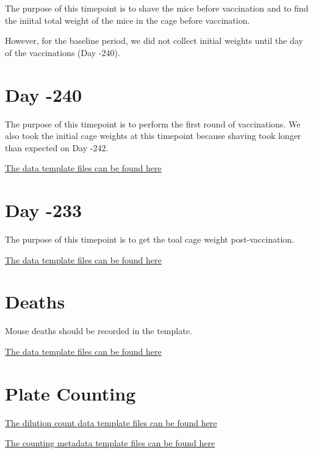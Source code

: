 \documentclass[]{book}
\begin{document}
The purpose of this timepoint is to shave the mice before vaccination
and to find the iniital total weight of the mice in the cage before
vaccination.

However, for the baseline period, we did not collect initial weights
until the day of the vaccinations (Day -240).

\chapter{Day -240}\label{day--240}

The purpose of this timepoint is to perform the first round of
vaccinations. We also took the initial cage weights at this timepoint
because shaving took longer than expected on Day -242.

\href{https://github.com/lyonsm7/impactb_book/raw/master/file_collection_templates/Base_Period/BP_T-240.xlsx}{The
data template files can be found here}

\chapter{Day -233}\label{day--233}

The purpose of this timepoint is to get the toal cage weight
post-vaccination.

\href{https://github.com/lyonsm7/impactb_book/raw/master/file_collection_templates/Base_Period/BP_T-233.xlsx}{The
data template files can be found here}

\chapter{Deaths}\label{deaths}

Mouse deaths should be recorded in the template.

\href{https://github.com/lyonsm7/impactb_book/raw/master/file_collection_templates/Base_Period/BP_Mouse_Deaths.xlsx}{The
data template files can be found here}

\chapter{Plate Counting}\label{plate-counting}

\href{https://github.com/lyonsm7/impactb_book/raw/master/file_collection_templates/Base_Period/dilution_counts_for_plates.xlsx}{The
dilution count data template files can be found here}

\href{https://github.com/lyonsm7/impactb_book/raw/master/file_collection_templates/Base_Period/inoculum_meta_data_plating.xlsx}{The
counting metadata template files can be found here}


\end{document}
